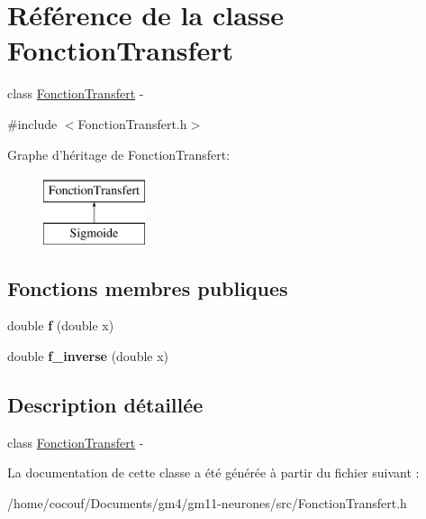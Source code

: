 \hypertarget{classFonctionTransfert}{
\section{Référence de la classe FonctionTransfert}
\label{classFonctionTransfert}
}


class \hyperlink{classFonctionTransfert}{FonctionTransfert} -\/  




{\ttfamily \#include $<$FonctionTransfert.h$>$}

Graphe d'héritage de FonctionTransfert:\begin{figure}[H]
\begin{center}
\leavevmode
\includegraphics[height=2.000000cm]{classFonctionTransfert}
\end{center}
\end{figure}
\subsection*{Fonctions membres publiques}
\begin{DoxyCompactItemize}
\item 
\hypertarget{classFonctionTransfert_a6ddac1c50866b849bd7ae2f11caa2041}{
double {\bfseries f} (double x)}
\label{classFonctionTransfert_a6ddac1c50866b849bd7ae2f11caa2041}

\item 
\hypertarget{classFonctionTransfert_a095ee7763431d3253458d6b6f58582c5}{
double {\bfseries f\_\-inverse} (double x)}
\label{classFonctionTransfert_a095ee7763431d3253458d6b6f58582c5}

\end{DoxyCompactItemize}


\subsection{Description détaillée}
class \hyperlink{classFonctionTransfert}{FonctionTransfert} -\/ 

La documentation de cette classe a été générée à partir du fichier suivant :\begin{DoxyCompactItemize}
\item 
/home/cocouf/Documents/gm4/gm11-\/neurones/src/FonctionTransfert.h\end{DoxyCompactItemize}
